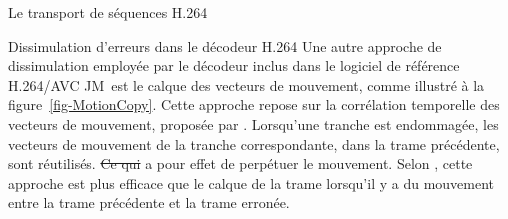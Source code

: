 \documentclass[letterpaper, twoside, 12pt,memoire]{thETS}
\newcommand{\fig}[1]{figure~\ref{#1}}
\newcommand{\ltCodec}{logiciel de référence H.264/AVC JM}
\providecommand{\DIFadd}[1]{{\protect\color{blue}\uwave{#1}}} %
\providecommand{\DIFdel}[1]{{\protect\color{red}\sout{#1}}}                      %
\providecommand{\DIFaddbegin}{} %
\providecommand{\DIFaddend}{} %
\providecommand{\DIFdelbegin}{} %
\providecommand{\DIFdelend}{} %
\begin{document}
\begin{chapter}{Le transport de séquences H.264}
\begin{section}{Dissimulation d'erreurs dans le décodeur H.264}
Une autre approche de dissimulation employée par le décodeur inclus dans le
\ltCodec~est le calque des vecteurs de mouvement, comme illustré à la
\fig{fig-MotionCopy}. Cette approche repose sur la corrélation temporelle des
vecteurs de mouvement, proposée par \citet{Wu2006}. Lorsqu'une tranche est
endommagée, les vecteurs de mouvement de la tranche correspondante, dans la
trame précédente, sont réutilisés. \DIFdelbegin \DIFdel{Ce qui }\DIFdelend \DIFaddbegin \DIFadd{Cela }\DIFaddend a pour effet de perpétuer le
mouvement. Selon \citeauthor{Wu2006}, cette approche est plus efficace que le
calque de la trame lorsqu'il y a du mouvement entre la trame précédente et la
trame erronée.

\begin{figure}[htb]
\end{figure}
\end{section}
\end{chapter}
\end{document}
